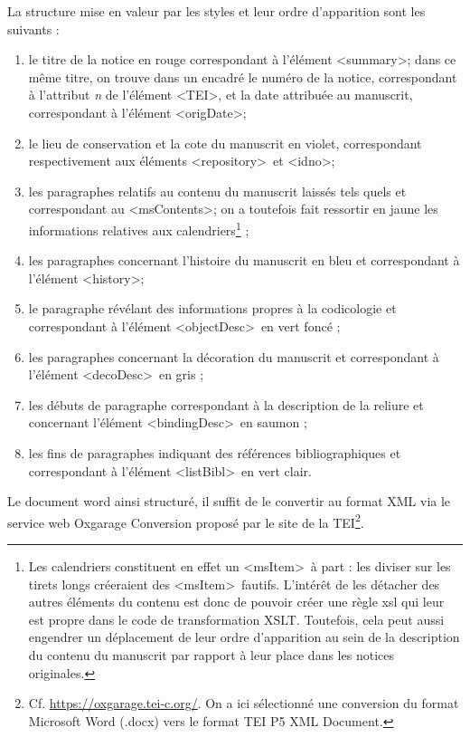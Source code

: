 \documentclass[a4paper,12pt,twoside]{book}
\begin{document}
	La structure mise en valeur par les styles et leur ordre d'apparition sont les suivants : 
	\begin{enumerate}
	    \item le titre de la notice en rouge correspondant à l'élément \textless summary\textgreater ; dans ce même titre, on trouve dans un encadré le numéro de la notice, correspondant à l'attribut \textit{n} de l'élément \textless TEI\textgreater, et la date attribuée au manuscrit, correspondant à l'élément \textless origDate\textgreater ;
	    \item le lieu de conservation et la cote du manuscrit en violet, correspondant respectivement aux éléments \textless repository\textgreater~et \textless idno\textgreater ;
	    \item les paragraphes relatifs au contenu du manuscrit laissés tels quels et correspondant au \textless msContents\textgreater ; on a toutefois fait ressortir en jaune les informations relatives aux calendriers\footnote{Les calendriers constituent en effet un \textless msItem\textgreater~à part : les diviser sur les tirets longs créeraient des \textless msItem\textgreater~fautifs. L'intérêt de les détacher des autres éléments du contenu est donc de pouvoir créer une règle xsl qui leur est propre dans le code de transformation XSLT. Toutefois, cela peut aussi engendrer un déplacement de leur ordre d'apparition au sein de la description du contenu du manuscrit par rapport à leur place dans les notices originales.} ;
	   \item les paragraphes concernant l'histoire du manuscrit en bleu et correspondant à l'élément \textless history\textgreater ;
	   \item le paragraphe révélant des informations propres à la codicologie et correspondant à l'élément \textless objectDesc\textgreater~en vert foncé ;
	   \item les paragraphes concernant la décoration du manuscrit et correspondant à l'élément \textless decoDesc\textgreater~en gris ;
	   \item les débuts de paragraphe correspondant à la description de la reliure et concernant l'élément \textless bindingDesc\textgreater~en saumon ;
	   \item les fins de paragraphes indiquant des références bibliographiques et correspondant à l'élément \textless listBibl\textgreater~en vert clair.
	\end{enumerate}
	
	Le document word ainsi structuré, il suffit de le convertir au format XML via le service web Oxgarage Conversion proposé par le site de la TEI\footnote{Cf. \url{https://oxgarage.tei-c.org/}. On a ici sélectionné une conversion du format Microsoft Word (.docx) vers le format TEI P5 XML Document.}.
	
\end{document}
